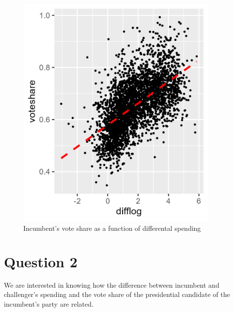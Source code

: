 \documentclass[12pt,letterpaper]{article}
\begin{document}
	    \begin{figure}
		    \includegraphics[width=0.9\textwidth]{Graphics/vote_spend.png}
		    \caption{Incumbent's vote share as a function of differental spending}
		    \label{fig:vote_spend}
	    \end{figure}

\clearpage
\newpage

\section*{Question 2}
\noindent We are interested in knowing how the difference between incumbent and challenger's spending and the vote share of the presidential candidate of the incumbent's party are related.%
\end{document}
